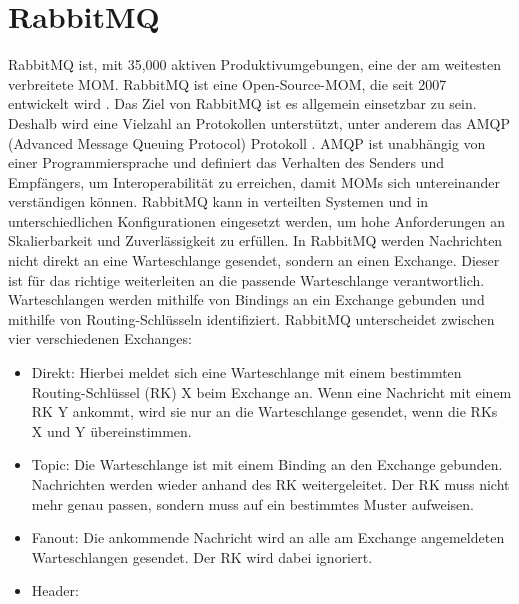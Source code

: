 

\section{RabbitMQ}
RabbitMQ ist, mit 35,000 aktiven Produktivumgebungen, eine der am weitesten verbreitete MOM. 
RabbitMQ ist eine Open-Source-MOM, die seit 2007 entwickelt wird \cite{rabbitmq}. Das Ziel von RabbitMQ ist es allgemein einsetzbar zu sein. Deshalb wird eine Vielzahl an Protokollen unterstützt, unter anderem das AMQP (Advanced Message Queuing Protocol) Protokoll \cite{amqp}. AMQP ist unabhängig von einer Programmiersprache und definiert das Verhalten des Senders und Empfängers, um Interoperabilität zu erreichen, damit MOMs sich untereinander verständigen können. RabbitMQ kann in verteilten Systemen und in unterschiedlichen Konfigurationen eingesetzt werden, um hohe Anforderungen an Skalierbarkeit und Zuverlässigkeit zu erfüllen. In RabbitMQ werden Nachrichten nicht direkt an eine Warteschlange gesendet, sondern an einen Exchange. Dieser ist für das richtige weiterleiten an die passende Warteschlange verantwortlich. Warteschlangen werden mithilfe von Bindings an ein Exchange gebunden und mithilfe von Routing-Schlüsseln identifiziert. RabbitMQ unterscheidet zwischen vier verschiedenen Exchanges:
\begin{itemize}
    \item Direkt: Hierbei meldet sich eine Warteschlange mit einem bestimmten Routing-Schlüssel (RK) X beim Exchange an. Wenn eine Nachricht mit einem RK Y ankommt, wird sie nur an die Warteschlange gesendet, wenn die RKs X und Y übereinstimmen.
    \item Topic: Die Warteschlange ist mit einem Binding an den Exchange gebunden. Nachrichten werden wieder anhand des RK weitergeleitet. Der RK muss nicht mehr genau passen, sondern muss auf ein bestimmtes Muster aufweisen.
    \item Fanout: Die ankommende Nachricht wird an alle am Exchange angemeldeten Warteschlangen gesendet. Der RK wird dabei ignoriert.
    \item Header:
\end{itemize}
